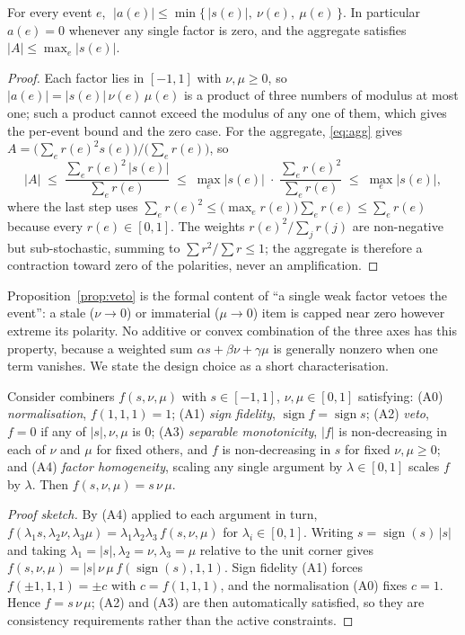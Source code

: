 \documentclass{elektr}
\begin{document}
\begin{proposition}
\label{prop:veto}
For every event $e$, $\;|a(e)| \le \min\{\,|s(e)|,\ \nu(e),\ \mu(e)\,\}$. In particular $a(e)=0$ whenever any single factor is zero, and the aggregate satisfies $|A|\le \max_{e}|s(e)|$.
\end{proposition}
\begin{proof}
Each factor lies in $[-1,1]$ with $\nu,\mu\ge 0$, so $|a(e)|=|s(e)|\,\nu(e)\,\mu(e)$ is a product of three numbers of modulus at most one; such a product cannot exceed the modulus of any one of them, which gives the per-event bound and the zero case. For the aggregate, \eqref{eq:agg} gives $A=\big(\sum_e r(e)^2 s(e)\big)/\big(\sum_e r(e)\big)$, so
\[
|A|\;\le\;\frac{\sum_e r(e)^2\,|s(e)|}{\sum_e r(e)}\;\le\;\max_e|s(e)|\;\cdot\;\frac{\sum_e r(e)^2}{\sum_e r(e)}\;\le\;\max_e|s(e)|,
\]
where the last step uses $\sum_e r(e)^2\le\big(\max_e r(e)\big)\sum_e r(e)\le\sum_e r(e)$ because every $r(e)\in[0,1]$. The weights $r(e)^2/\sum_j r(j)$ are non-negative but sub-stochastic, summing to $\sum r^2/\sum r\le 1$; the aggregate is therefore a contraction toward zero of the polarities, never an amplification.
\end{proof}

Proposition~\ref{prop:veto} is the formal content of ``a single weak factor vetoes the event'': a stale ($\nu\!\to\!0$) or immaterial ($\mu\!\to\!0$) item is capped near zero however extreme its polarity. No additive or convex combination of the three axes has this property, because a weighted sum $\alpha s+\beta\nu+\gamma\mu$ is generally nonzero when one term vanishes. We state the design choice as a short characterisation.

\begin{proposition}[Characterisation]
\label{prop:char}
Consider combiners $f(s,\nu,\mu)$ with $s\in[-1,1]$, $\nu,\mu\in[0,1]$ satisfying: (A0) \emph{normalisation}, $f(1,1,1)=1$; (A1) \emph{sign fidelity}, $\operatorname{sign} f=\operatorname{sign} s$; (A2) \emph{veto}, $f=0$ if any of $|s|,\nu,\mu$ is $0$; (A3) \emph{separable monotonicity}, $|f|$ is non-decreasing in each of $\nu$ and $\mu$ for fixed others, and $f$ is non-decreasing in $s$ for fixed $\nu,\mu\ge0$; and (A4) \emph{factor homogeneity}, scaling any single argument by $\lambda\in[0,1]$ scales $f$ by $\lambda$. Then $f(s,\nu,\mu)=s\,\nu\,\mu$.
\end{proposition}
\begin{proof}[Proof sketch]
By (A4) applied to each argument in turn, $f(\lambda_1 s,\lambda_2\nu,\lambda_3\mu)=\lambda_1\lambda_2\lambda_3\, f(s,\nu,\mu)$ for $\lambda_i\in[0,1]$. Writing $s=\operatorname{sign}(s)\,|s|$ and taking $\lambda_1=|s|,\lambda_2=\nu,\lambda_3=\mu$ relative to the unit corner gives $f(s,\nu,\mu)=|s|\,\nu\,\mu\,f(\operatorname{sign}(s),1,1)$. Sign fidelity (A1) forces $f(\pm1,1,1)=\pm c$ with $c=f(1,1,1)$, and the normalisation (A0) fixes $c=1$. Hence $f=s\,\nu\,\mu$; (A2) and (A3) are then automatically satisfied, so they are consistency requirements rather than the active constraints.
\end{proof}
\end{document}
